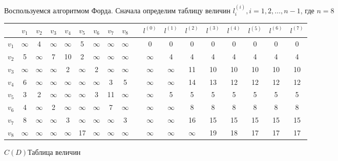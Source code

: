 \documentclass[12pt, letterpaper, titlepage]{article}
\begin{document}
Воспользуемся алгоритмом Форда. Сначала определим таблицу величин $l_{i}^{(i)}, i=1,2,\dots,n-1$, где $n=8$
\begin{center}
    \begin{tabular}{ | c | c | c | c | c | c | c | c | c | c |c |c |c |c |c |c |c |c |}
        \hline
        \rule{0pt}{13pt} & $v_1$     & $v_2$     & $v_3$     & $v_4$     & $v_5$     & $v_6$     & $v_7$     & $v_8$     &
                         & $l^{(0)}$ & $l^{(1)}$ & $l^{(2)}$ & $l^{(3)}$ & $l^{(4)}$ & $l^{(5)}$ & $l^{(6)}$ & $l^{(7)}$   \\
        \hline
        $v_1$            & $\infty$  & 4         & $\infty$  & $\infty$  & 5         & $\infty$  & $\infty$  & $\infty$  &
                         & 0         & 0         & 0         & 0         & 0         & 0         & 0         & 0           \\
        \hline
        $v_2$            & 5         & $\infty$  & 7         & 10        & 2         & $\infty$  & $\infty$  & $\infty$  &
                         & $\infty$  & 4         & 4         & 4         & 4         & 4         & 4         & 4           \\
        \hline
        $v_3$            & $\infty$  & $\infty$  & $\infty$  & 2         & $\infty$  & 2         & $\infty$  & $\infty$  &
                         & $\infty$  & $\infty$  & 11        & 10        & 10        & 10        & 10        & 10          \\
        \hline
        $v_4$            & 6         & $\infty$  & $\infty$  & $\infty$  & $\infty$  & $\infty$  & 3         & 5         &
                         & $\infty$  & $\infty$  & 14        & 13        & 12        & 12        & 12        & 12          \\
        \hline
        $v_5$            & 3         & 2         & $\infty$  & $\infty$  & $\infty$  & 3         & 11        & $\infty$  &
                         & $\infty$  & 5         & 5         & 5         & 5         & 5         & 5         & 5           \\
        \hline
        $v_6$            & 4         & $\infty$  & 2         & $\infty$  & $\infty$  & $\infty$  & 7         & $\infty$  &
                         & $\infty$  & $\infty$  & 8         & 8         & 8         & 8         & 8         & 8           \\
        \hline
        $v_7$            & 8         & $\infty$  & $\infty$  & 3         & $\infty$  & $\infty$  & $\infty$  & 3         &
                         & $\infty$  & $\infty$  & 16        & 15        & 15        & 15        & 15        & 15          \\
        \hline
        $v_8$            & $\infty$  & $\infty$  & $\infty$  & $\infty$  & 17        & $\infty$  & $\infty$  & $\infty$  &
                         & $\infty$  & $\infty$  & $\infty$  & 19        & 18        & 17        & 17        & 17          \\
        \hline
    \end{tabular}
\end{center}
\hspace{3.5cm}$C(D)$\hspace{6.5cm}Таблица величин
\end{document}
